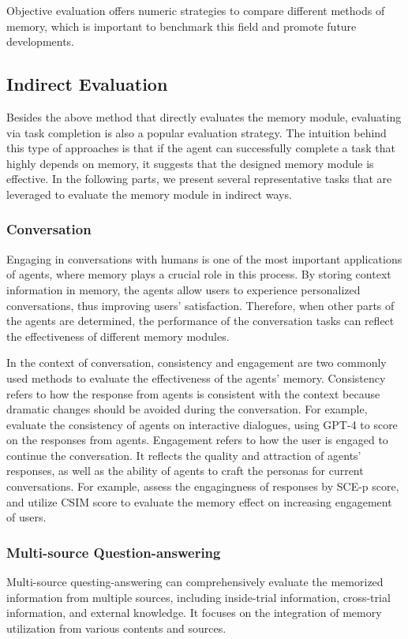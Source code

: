 \documentclass{article}
\theoremstyle{definition}
\theoremstyle{theorem}
\theoremstyle{proof}
\theoremstyle{remark}
\begin{document}
	Objective evaluation offers numeric strategies to compare different methods of memory, which is important to benchmark this field and promote future developments.
	
	
	\subsection{Indirect Evaluation}
	Besides the above method that directly evaluates the memory module, evaluating via task completion is also a popular evaluation strategy.
	The intuition behind this type of approaches is that if the agent can successfully complete a task that highly depends on memory, it suggests that the designed memory module is effective.
	In the following parts, we present several representative tasks that are leveraged to evaluate the memory module in indirect ways.
	
	
	\subsubsection{Conversation}
	Engaging in conversations with humans is one of the most important applications of agents, where memory plays a crucial role in this process. By storing context information in memory, the agents allow users to experience personalized conversations, thus improving users' satisfaction. Therefore, when other parts of the agents are determined, the performance of the conversation tasks can reflect the effectiveness of different memory modules.
	
	In the context of conversation, consistency and engagement are two commonly used methods to evaluate the effectiveness of the agents' memory.
	Consistency refers to how the response from agents is consistent with the context because dramatic changes should be avoided during the conversation. For example, \citet{memochat} evaluate the consistency of agents on interactive dialogues, using GPT-4 to score on the responses from agents.
	Engagement refers to how the user is engaged to continue the conversation. It reflects the quality and attraction of agents' responses, as well as the ability of agents to craft the personas for current conversations. For example, \citet{mpc} assess the engagingness of responses by SCE-p score, and \citet{memgpt} utilize CSIM score to evaluate the memory effect on increasing engagement of users.
	
	\subsubsection{Multi-source Question-answering}
	Multi-source questing-answering can comprehensively evaluate the memorized information from multiple sources, including inside-trial information, cross-trial information, and external knowledge. It focuses on the integration of memory utilization from various contents and sources.
	
\end{document}
